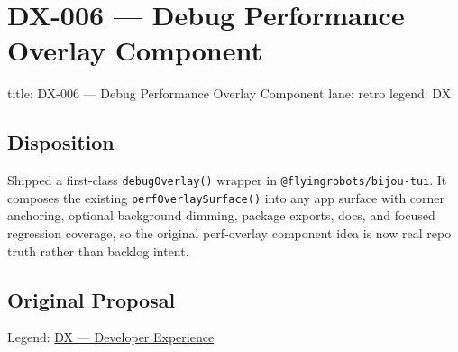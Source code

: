 \chapter{DX-006 --- Debug Performance Overlay Component}\label{record-338}

\smallskip

\begin{RecordMeta}
title: DX-006 — Debug Performance Overlay Component
lane: retro
legend: DX

\end{RecordMeta}

\section{Disposition}\label{record-338-disposition}

Shipped a first-class \texttt{d\allowbreak{}e\allowbreak{}b\allowbreak{}u\allowbreak{}g\allowbreak{}O\allowbreak{}v\allowbreak{}e\allowbreak{}r\allowbreak{}l\allowbreak{}a\allowbreak{}y\allowbreak{}(\allowbreak{})} wrapper in \texttt{@\allowbreak{}f\allowbreak{}l\allowbreak{}y\allowbreak{}i\allowbreak{}n\allowbreak{}g\allowbreak{}r\allowbreak{}o\allowbreak{}b\allowbreak{}o\allowbreak{}t\allowbreak{}s\allowbreak{}/\allowbreak{}b\allowbreak{}i\allowbreak{}j\allowbreak{}o\allowbreak{}u\allowbreak{}-\allowbreak{}t\allowbreak{}u\allowbreak{}i}. It composes the existing \texttt{p\allowbreak{}e\allowbreak{}r\allowbreak{}f\allowbreak{}O\allowbreak{}v\allowbreak{}e\allowbreak{}r\allowbreak{}l\allowbreak{}a\allowbreak{}y\allowbreak{}S\allowbreak{}u\allowbreak{}r\allowbreak{}f\allowbreak{}a\allowbreak{}c\allowbreak{}e\allowbreak{}(\allowbreak{})} into any app surface with corner anchoring, optional background dimming, package exports, docs, and focused regression coverage, so the original perf-overlay component idea is now real repo truth rather than backlog intent.

\section{Original Proposal}\label{record-338-original-proposal}

Legend: \href{https://github.com/flyingrobots/bijou/blob/1853ad902f6bf219326409e7f743a5a1d6517dbc/docs/method/legends/DX-developer-experience.md}{DX --- Developer Experience}

